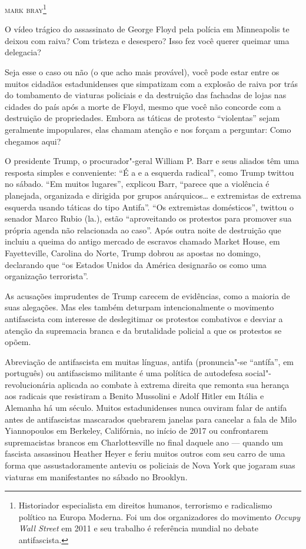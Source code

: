 \hfill{}\textsc{mark bray\footnote{Historiador especialista em direitos humanos, terrorismo e radicalismo político na Europa Moderna. Foi um dos organizadores do movimento \emph{Occupy Wall Street} em 2011 e seu trabalho é referência mundial no debate antifascista.}}

\bigskip

O vídeo trágico do assassinato de George Floyd pela polícia em Minneapolis te deixou com raiva? Com tristeza e desespero? Isso fez você querer queimar uma delegacia?
 
Seja esse o caso ou não (o que acho mais provável), você pode estar entre os muitos cidadãos estadunidenses que simpatizam com a explosão de raiva por trás do tombamento de viaturas policiais e da destruição das fachadas de lojas nas cidades do país após a morte de Floyd, mesmo que você não concorde com a destruição de propriedades. Embora as táticas de protesto ``violentas'' sejam geralmente impopulares, elas chamam atenção e nos forçam a perguntar: Como chegamos aqui?

O presidente Trump, o procurador"-geral William P. Barr e seus aliados têm uma resposta simples e conveniente: ``É a  e a esquerda radical'', como Trump twittou no sábado. ``Em muitos lugares'', explicou Barr, ``parece que a violência é planejada, organizada e dirigida por grupos anárquicos\ldots{} e extremistas de extrema esquerda usando táticas do tipo Antifa''. ``Os extremistas domésticos'', twittou o senador Marco Rubio (la.), estão ``aproveitando os protestos para promover sua própria agenda não relacionada ao caso''. Após outra noite de destruição que incluiu a queima do antigo mercado de escravos chamado Market House, em Fayetteville, Carolina do Norte, Trump dobrou as apostas no domingo, declarando que ``os Estados Unidos da América designarão os  como uma organização terrorista''.
 
As acusações imprudentes de Trump carecem de evidências, como a maioria de suas alegações. Mas eles também deturpam intencionalmente o movimento antifascista com interesse de deslegitimar os protestos combativos e desviar a atenção da supremacia branca e da brutalidade policial a que os protestos se opõem.
 
Abreviação de antifascista em muitas línguas, antifa (pronuncia"-se ``antífa'', em português) ou antifascismo militante é uma política de autodefesa social"-revolucionária aplicada ao combate à extrema direita que remonta sua herança aos radicais que resistiram a Benito Mussolini e Adolf Hitler em Itália e Alemanha há um século. Muitos estadunidenses nunca ouviram falar de antifa antes de antifascistas mascarados quebrarem janelas para cancelar a fala de Milo Yiannopoulos em Berkeley, Califórnia, no início de 2017 ou confrontarem supremacistas brancos em Charlottesville no final daquele ano — quando um fascista assassinou Heather Heyer e feriu muitos outros com seu carro de uma forma que assustadoramente anteviu os policiais de Nova York que jogaram suas viaturas em manifestantes no sábado no Brooklyn.

